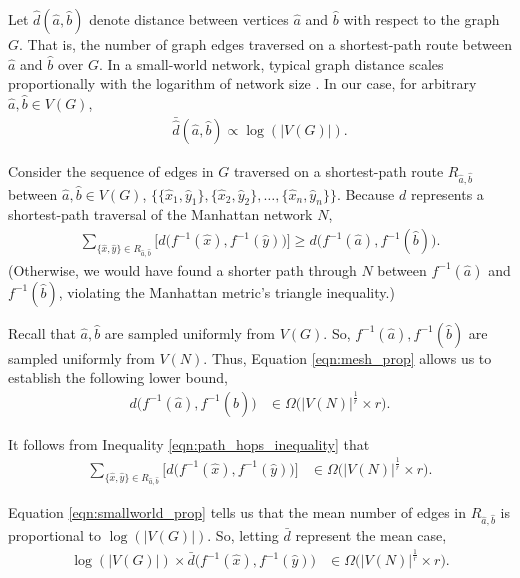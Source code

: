 Let $\hat{d}(\hat{a},\hat{b})$ denote distance between vertices $\hat{a}$ and $\hat{b}$ with respect to the graph $G$.
That is, the number of graph edges traversed on a shortest-path route between $\hat{a}$ and $\hat{b}$ over $G$.
In a small-world network, typical graph distance scales proportionally with the logarithm of network size \citep{watts1998collective}.
In our case, for arbitrary $\hat{a},\hat{b} \in V(G)$,
\begin{align} \label{eqn:smallworld_prop}
\bar{\hat{d}}(\hat{a},\hat{b}) \propto \log(|V(G)|).
\end{align}

Consider the sequence of edges in $G$ traversed on a shortest-path route $R_{\hat{a},\hat{b}}$ between $\hat{a}, \hat{b} \in V(G)$, $\{\{\hat{x}_1, \hat{y}_1\}, \{\hat{x}_2, \hat{y}_2\}, \ldots, \{\hat{x}_n, \hat{y}_n\} \}$.
Because $d$ represents a shortest-path traversal of the Manhattan network $N$,
\begin{align} \label{eqn:path_hops_inequality}
\sum_{\{\hat{x}, \hat{y}\} \in  R_{\hat{a},\hat{b}}}
\Big[ d\Big(f^{-1}(\hat{x}), f^{-1}(\hat{y})\Big) \Big]
\geq
d\Big(f^{-1}(\hat{a}), f^{-1}(\hat{b})\Big).
\end{align}
(Otherwise, we would have found a shorter path through $N$ between $f^{-1}(\hat{a})$ and $f^{-1}(\hat{b})$, violating the Manhattan metric's triangle inequality.)

Recall that $\hat{a},\hat{b}$ are sampled uniformly from $V(G)$.
So, $f^{-1}(\hat{a}),f^{-1}(\hat{b})$ are sampled uniformly from $V(N)$.
Thus, Equation \ref{eqn:mesh_prop} allows us to establish the following lower bound,
\begin{align*}
d\Big(f^{-1}(\hat{a}), f^{-1}(\hat{b})\Big)
&\in
\Omega \Big(
  |V(N)|^{\frac{1}{r}} \times r
\Big).
\end{align*}

It follows from Inequality \ref{eqn:path_hops_inequality} that
\begin{align*}
\sum_{\{\hat{x}, \hat{y}\} \in  R_{\hat{a},\hat{b}}}
\Big[ d\Big(f^{-1}(\hat{x}), f^{-1}(\hat{y})\Big) \Big]
&\in
\Omega \Big(
  |V(N)|^{\frac{1}{r}} \times r
\Big).
\end{align*}

Equation \ref{eqn:smallworld_prop} tells us that the mean number of edges in $R_{\hat{a}, \hat{b}}$ is proportional to $\log(|V(G)|)$.
So, letting $\bar{d}$ represent the mean case,
\begin{align*}
\log(|V(G)|) \times \bar{d}\Big(f^{-1}(\hat{x}), f^{-1}(\hat{y})\Big)
&\in
\Omega \Big(
  |V(N)|^{\frac{1}{r}} \times r
\Big).
\end{align*}


